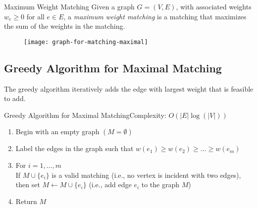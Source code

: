 \documentclass[../open-optimization/open-optimization.tex]{subfiles}
\begin{document}






\begin{definition}{Maximum Weight Matching}
Given a graph $G = (V,E)$, with associated weights $w_e\geq 0$ for all $e \in E$, a \emph{maximum weight matching} is a matching that maximizes the sum of the weights in the matching.
\end{definition}

\begin{figure}[H]
\begin{center}
\texttt{[image: graph-for-matching-maximal]}
\end{center}
\end{figure}




%
%
\subsection{Greedy Algorithm for Maximal Matching}
The greedy algorithm iteratively adds the edge with largest weight that is feasible to add.  
\begin{general}{Greedy Algorithm for Maximal Matching}{Complexity: $O(|E|\log(|V|))$}
\label{alg:greedy-matching}
\begin{enumerate}
\item Begin with an empty graph $(M = \emptyset)$
\item Label the edges in the graph such that $w(e_1) \geq w(e_2) \geq \dots \geq w(e_m)$
\item For $i=1, \dots, m$\\
\indent  If $M \cup\{e_i\}$ is a valid matching (i.e., no vertex is incident with two edges), then set $M \leftarrow M \cup \{e_i\}$ (i.e., add edge $e_i$ to the graph $M$)
\item Return $M$
\end{enumerate}
\end{general}
\end{document}
